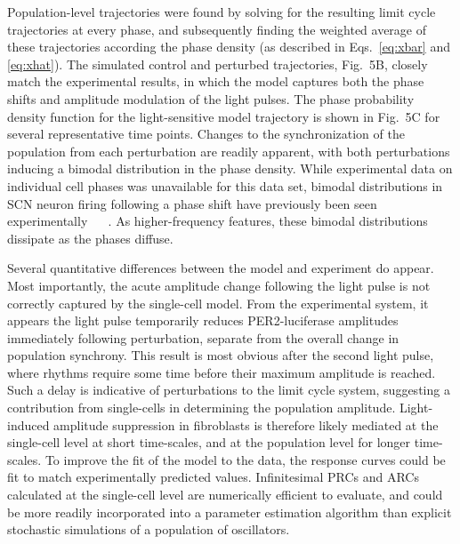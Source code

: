 \documentclass[11pt, letterpaper]{article}
\providecommand{\DIFadd}[1]{{\protect\color{blue}#1}} %
\providecommand{\DIFaddbegin}{} %
\providecommand{\DIFaddend}{} %
\begin{document}
\DIFaddbegin \DIFadd{Population-level trajectories were found by solving for the resulting limit cycle trajectories at every phase, and subsequently finding the weighted average of these trajectories according the phase density (as described in Eqs.~\ref{eq:xbar} and \ref{eq:xhat}).
The simulated }\DIFaddend control and perturbed trajectories, Fig.\DIFaddbegin \DIFadd{~5B}\DIFaddend , closely match the experimental results, in which the model captures both the phase shifts and amplitude modulation of the light pulses.
The phase probability density function for the light-sensitive model trajectory is shown in Fig.\DIFaddbegin \DIFadd{~5C }\DIFaddend for several representative time points.
Changes to the synchronization of the population from each perturbation are readily apparent, \DIFaddbegin \DIFadd{with both perturbations inducing a bimodal distribution in the phase density.
While experimental data on individual cell phases was unavailable for this data set, bimodal distributions in SCN neuron firing following a phase shift have previously been seen experimentally \mbox{%
\cite{Rohling2011}
}%
.
As higher-frequency features, these bimodal distributions }\DIFaddend dissipate as the phases diffuse.

\DIFaddbegin \DIFadd{Several }\DIFaddend quantitative differences between the model and experiment do appear\DIFaddbegin \DIFadd{.
Most importantly, }\DIFaddend the acute amplitude change following the light pulse \DIFaddbegin \DIFadd{is not correctly captured by the single-cell model}\DIFaddend .
From the experimental system, it appears the light pulse temporarily reduces PER2-luciferase amplitudes immediately following perturbation, separate from the overall change in population synchrony.
\DIFaddbegin \DIFadd{This result is most obvious after the second light pulse, where rhythms require some time before their maximum amplitude is reached.
Such a delay }\DIFaddend is indicative of perturbations to the \DIFaddbegin \DIFadd{limit cycle system, suggesting }\DIFaddend a contribution from single-cells in determining the population amplitude.
\DIFaddbegin \DIFadd{Light-induced amplitude suppression in fibroblasts is therefore likely mediated at the single-cell level at short time-scales, and at the population level for longer time-scales.
To improve the fit of the model to the data, the response curves could be fit to match experimentally predicted values.
Infinitesimal PRCs and ARCs calculated at the single-cell level are numerically efficient to evaluate, and could be more readily incorporated into a parameter estimation algorithm than explicit stochastic simulations of a population of oscillators.
}\DIFaddend 
\end{document}
